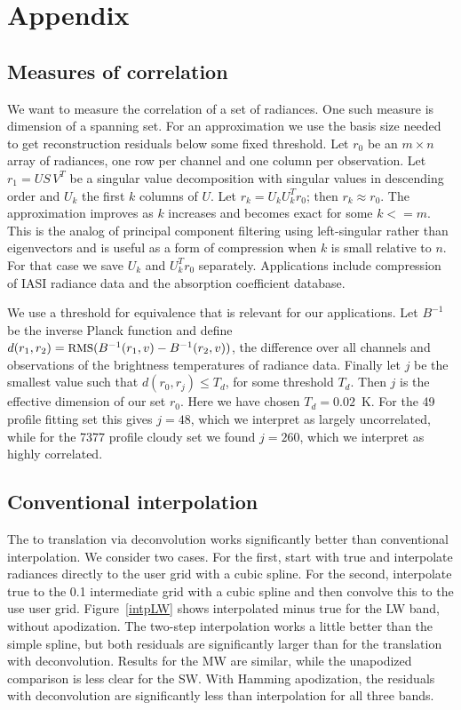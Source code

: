 \documentclass[journal]{IEEEtran}
\begin{document}
\section{Appendix}
\label{append}

\subsection{Measures of correlation}

We want to measure the correlation of a set of radiances.  One such
measure is dimension of a spanning set.  For an approximation we use
the basis size needed to get reconstruction residuals below some
fixed threshold.  Let $r_0$ be an $m \times n$ array of radiances,
one row per channel and one column per observation.  Let $r_1 = U
S\,V^T$ be a singular value decomposition with singular values in
descending order and $U_k$ the first $k$ columns of $U$.  Let $r_k =
U_k U_k^T r_0$; then $r_k \approx r_0$.  The approximation improves
as $k$ increases and becomes exact for some $k <= m$.  This is the
analog of principal component filtering using left-singular rather
than eigenvectors and is useful as a form of compression when $k$ is
small relative to $n$.  For that case we save $U_k$ and $U_k^T r_0$
separately.  Applications include compression of IASI radiance data
and the {\kcarta} absorption coefficient database.

We use a threshold for equivalence that is relevant for our
applications.  Let $B^{-1}$ be the inverse Planck function and
define $d(r_1, r_2) = \mbox{\small RMS}(B^{-1}(r_1, v) - B^{-1}(r_2, v))$, the
{\rms} difference over all channels and observations of the
brightness temperatures of radiance data.  Finally let $j$ be the
smallest value such that $d(r_0, r_j) \le T_d$, for some threshold
$T_d$.  Then $j$ is the effective dimension of our set $r_0$.  Here
we have chosen $T_d = 0.02$~K.  For the 49 profile fitting set this
gives $j=48$, which we interpret as largely uncorrelated, while for
the 7377 profile cloudy set we found $j=260$, which we interpret as
highly correlated.

\subsection{Conventional interpolation}

The {\airs} to {\cris} translation via deconvolution works
significantly better than conventional interpolation.  We consider
two cases.  For the first, start with true {\airs} and interpolate
radiances directly to the {\cris} user grid with a cubic spline.
For the second, interpolate true {\airs} to the 0.1 {\wn}
intermediate grid with a cubic spline and then convolve this to the
use {\cris} user grid.  Figure~\ref{intpLW} shows interpolated
{\cris} minus true {\cris} for the LW band, without apodization.
The two-step interpolation works a little better than the simple
spline, but both residuals are significantly larger than for the
translation with deconvolution.  Results for the MW are similar,
while the unapodized comparison is less clear for the SW.  With
Hamming apodization, the residuals with deconvolution are
significantly less than interpolation for all three bands.
\end{document}
